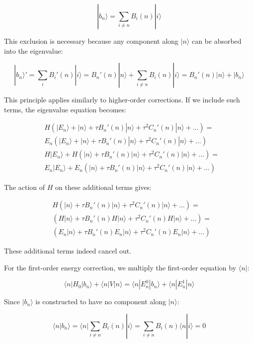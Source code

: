 \documentclass[italian]{HKNdocument}
\begin{document}
\begin{equation}
|b_n\rangle=\sum_{i\neq n}B_i(n)|i\rangle
\end{equation}

This exclusion is necessary because any component along $|n\rangle$ can be absorbed into the eigenvalue:

\begin{equation}
|b_n\rangle'=\sum_i B_i'(n)|i\rangle=B_n'(n)|n\rangle+\sum_{i\neq n}B_i(n)|i\rangle=B_n'(n)|n\rangle+|b_n\rangle
\end{equation}

This principle applies similarly to higher-order corrections. If we include such terms, the eigenvalue equation becomes:

\begin{align}
&H(|E_n\rangle+|n\rangle+\tau B_n'(n)|n\rangle+\tau^2 C_n'(n)|n\rangle+\ldots)=\\
&E_n(|E_n\rangle+|n\rangle+\tau B_n'(n)|n\rangle+\tau^2 C_n'(n)|n\rangle+\ldots)\\
&H|E_n\rangle+H(|n\rangle+\tau B_n'(n)|n\rangle+\tau^2 C_n'(n)|n\rangle+\ldots)=\\
&E_n|E_n\rangle+E_n(|n\rangle+\tau B_n'(n)|n\rangle+\tau^2 C_n'(n)|n\rangle+\ldots)
\end{align}

The action of $H$ on these additional terms gives:

\begin{align}
&H(|n\rangle+\tau B_n'(n)|n\rangle+\tau^2 C_n'(n)|n\rangle+\ldots)=\\
&(H|n\rangle+\tau B_n'(n)H|n\rangle+\tau^2 C_n'(n)H|n\rangle+\ldots)=\\
&(E_n|n\rangle+\tau B_n'(n)E_n|n\rangle+\tau^2 C_n'(n)E_n|n\rangle+\ldots)
\end{align}


These additional terms indeed cancel out.

For the first-order energy correction, we multiply the first-order equation by $\langle n|$:

\begin{equation}
\langle n|H_0|b_n\rangle+\langle n|V|n\rangle=\langle n|E_n^0|b_n\rangle+\langle n|E_n^1|n\rangle
\end{equation}

Since $|b_n\rangle$ is constructed to have no component along $|n\rangle$:

\begin{equation}
\langle n|b_n\rangle=\langle n|\sum_{i\neq n}B_i(n)|i\rangle=\sum_{i\neq n}B_i(n)\langle n|i\rangle=0
\end{equation}
\end{document}
